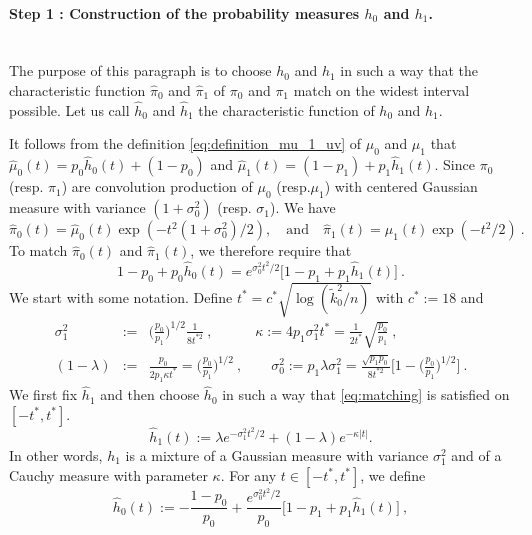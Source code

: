 \documentclass[twoside,11pt]{article}
\def\beq{\begin{equation}}
\def\eeq{\end{equation}}
\newcommand{\<}{\langle}
\renewcommand{\>}{\rangle}
\begin{document}
\paragraph{Step 1 : Construction of the probability measures $h_0$ and $h_1$.}~\\
The purpose of this paragraph is to choose $h_0$ and $h_1$ in such a way that the characteristic function $\widehat{\pi}_0$ and $\widehat{\pi}_1$ of $\pi_0$ and $\pi_1$ match on the widest interval possible. Let us call $\widehat{h}_0$ and $\widehat{h}_1$ the characteristic function of $h_0$ and $h_1$. 

It follows from the definition \eqref{eq:definition_mu_1_uv} of $\mu_0$ and $\mu_1$ that 
 $\widehat{\mu}_0(t)=p_0 \widehat{h}_0(t) + (1-p_0) $ and $\widehat{\mu}_1(t) = (1 -p_1)+ p_1 \widehat{h}_1(t)$. Since $\pi_0$ (resp. $\pi_1$) are convolution production of $\mu_0$ (resp.$\mu_1$) with centered Gaussian measure with variance $(1+\sigma_0^2)$ (resp. $\sigma_1$). We have 
\beq\label{eq:def_pi_hat}
\widehat{\pi}_0(t) = \widehat{\mu}_0(t) \exp(-t^2(1+\sigma_0^2)/2),\quad \mathrm{and}\quad \widehat{\pi}_1(t) = \widehat{\mu}_1(t) \exp(-t^2/2)\ .
\eeq
To match $\widehat{\pi}_0(t)$ and $\widehat{\pi}_1(t)$, we therefore require that
\beq \label{eq:matching}
 1-p_0 + p_0 \widehat{h}_0(t)= e^{\sigma_0^2t^2/2}\big[1-p_1 + p_1 \widehat{h}_1(t)\big]\ . 
\eeq
We start with some notation. 
Define  $t^* = c^* \sqrt{\log(\tilde k_0^2/n)}$ with $c^* := 18$ and 
\begin{eqnarray}\label{eq:def_sigma1}
\sigma_1^2&:=& \Big(\frac{p_0}{p_1}\Big)^{1/2} \frac{1}{8t^{*2}}\ ,\quad \quad \quad  \kappa:= 4p_1 \sigma_1^2 t^*=  \frac{1}{2t^*} \sqrt{\frac{p_0}{p_1}}\ ,\\ 
(1-\lambda)&:=& \frac{p_0}{2p_1\kappa t^*}=  \big(\frac{p_0}{p_1}\big)^{1/2}\ , \quad \quad 
\sigma_0^2 := p_1\lambda\sigma_1^2 = \frac{\sqrt{p_1p_0}}{8 t^{*2}}\Big[1 - \big(\frac{p_0}{p_1}\big)^{1/2}\Big]\ .\nonumber
\end{eqnarray}
We first fix $\widehat{h}_1$ and then choose $\widehat{h}_0$ in such a way that \eqref{eq:matching} is satisfied on $[-t^*,t^*]$. 
\beq\label{eq:def_f1_hat}
\widehat{h}_1(t):= \lambda e^{-\sigma_1^2t^2/2}+ (1-\lambda) e^{- \kappa  |t|}.
\eeq
In other words,  $h_1$ is a mixture of a Gaussian measure with variance $\sigma_1^2$ and of a Cauchy measure with  parameter $\kappa$. For any $t \in [-t^*,t^*]$, we define 
\begin{equation}\label{eq:definition_f_0} 
\widehat{h}_0(t):= -\frac{1-p_0}{p_0 } + \frac{e^{\sigma_0^2t^2 /2}}{p_0} \Big[1 -p_1 + p_1 \widehat{h}_1(t)\Big]\ , 
\end{equation}
\end{document}
